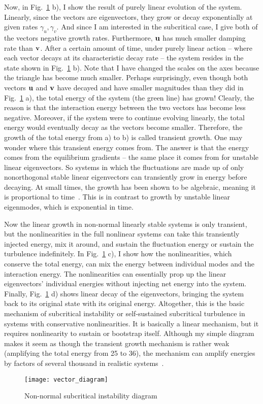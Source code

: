 Now, in Fig.~\ref{vector_diagram} b), I show the result of purely linear evolution of the system. Linearly, since the vectors are eigenvectors, 
they grow or decay exponentially at given rates $\gamma_u, \gamma_v$. And since I am
interested in the subcritical case, I give both of the vectors negative growth rates. Furthermore, ${\bf u}$ has much smaller damping rate than ${\bf v}$. After a certain amount of time, under
purely linear action -- where each vector decays at its characteristic decay rate -- the system resides in the state shown in Fig.~\ref{vector_diagram} b). Note that I have changed the scales on
the axes because the triangle has become much smaller. Perhaps surprisingly, even though both vectors ${\bf u}$ and ${\bf v}$ have decayed and have smaller magnitudes than they did in 
Fig.~\ref{vector_diagram} a), the total energy of the system (the green line) has grown! Clearly, the reason is that the interaction energy between the two vectors has become less negative.
Moreover, if the system were to continue evolving linearly, the total energy would eventually decay as the vectors become smaller. Therefore, the growth of the total energy from a) to b)
is called transient growth. One may wonder where this transient energy comes from. The answer is that the energy comes from the equilibrium gradients -- the same place it comes from for 
unstable linear eigenvectors.
So systems in which the fluctuations are made up of only nonorthogonal stable linear eigenvectors can transiently grow in energy before decaying. At small times, the growth has been shown to be
algebraic, meaning it is proportional to time~\cite{waleffe1995}. This is in contrast to growth by unstable linear eigenmodes, which is exponential in time.

Now the linear growth in non-normal linearly stable systems is only transient, but the nonlinearities in the full nonlinear systems can take this transiently injected energy, mix it around,
and sustain the fluctuation energy or sustain the turbulence indefinitely. In Fig.~\ref{vector_diagram} c), I show how the nonlinearities, which conserve the total energy, can mix the energy
between individual modes and the interaction energy. The nonlinearities can essentially prop up the linear eigenvectors' individual energies without injecting net energy into the system.
Finally, Fig.~\ref{vector_diagram} d) shows linear decay of the eigenvectors, bringing the system back to its original state with its original energy. Altogether, this is the basic
mechanism of subcritical instability or self-sustained subcritical turbulence in systems with conservative nonlinearities. It is basically a linear mechanism, but it requires nonlinearity to
sustain or bootstrap itself.
Although my simple diagram makes it seem as though the transient growth mechanism is rather weak
(amplifying the total energy from 25 to 36), the mechanism can amplify energies by factors of several thousand in realistic systems~\cite{gustavsson1991,butler1992}.

\begin{figure}
\centerline{\texttt{[image: vector\_diagram]}}
\caption{Non-normal subcritical instability diagram}
\label{vector_diagram}
\end{figure}
